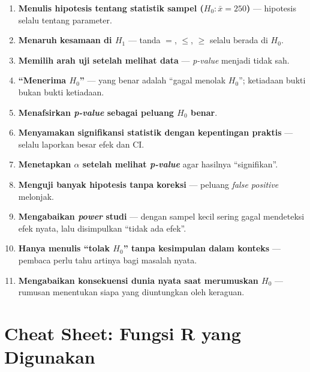 \documentclass[
  indonesian,
  letterpaper,
]{book}
\providecommand{\tightlist}{%
  \setlength{\itemsep}{0pt}\setlength{\parskip}{0pt}}
\begin{document}
\begin{enumerate}
\def\labelenumi{\arabic{enumi}.}
\tightlist
\item
  \textbf{Menulis hipotesis tentang statistik sampel
  (\(H_0: \bar{x} = 250\))} --- hipotesis selalu tentang parameter.
\item
  \textbf{Menaruh kesamaan di \(H_1\)} --- tanda \(=\), \(\le\), \(\ge\)
  selalu berada di \(H_0\).
\item
  \textbf{Memilih arah uji setelah melihat data} --- \emph{p-value}
  menjadi tidak sah.
\item
  \textbf{``Menerima \(H_0\)''} --- yang benar adalah ``gagal menolak
  \(H_0\)''; ketiadaan bukti bukan bukti ketiadaan.
\item
  \textbf{Menafsirkan \emph{p-value} sebagai peluang \(H_0\) benar}.
\item
  \textbf{Menyamakan signifikansi statistik dengan kepentingan praktis}
  --- selalu laporkan besar efek dan CI.
\item
  \textbf{Menetapkan \(\alpha\) setelah melihat \emph{p-value}} agar
  hasilnya ``signifikan''.
\item
  \textbf{Menguji banyak hipotesis tanpa koreksi} --- peluang
  \emph{false positive} melonjak.
\item
  \textbf{Mengabaikan \emph{power} studi} --- dengan sampel kecil sering
  gagal mendeteksi efek nyata, lalu disimpulkan ``tidak ada efek''.
\item
  \textbf{Hanya menulis ``tolak \(H_0\)'' tanpa kesimpulan dalam
  konteks} --- pembaca perlu tahu artinya bagi masalah nyata.
\item
  \textbf{Mengabaikan konsekuensi dunia nyata saat merumuskan \(H_0\)}
  --- rumusan menentukan siapa yang diuntungkan oleh keraguan.
\end{enumerate}

\section{Cheat Sheet: Fungsi R yang
Digunakan}\label{cheat-sheet-fungsi-r-yang-digunakan-6}
\end{document}
